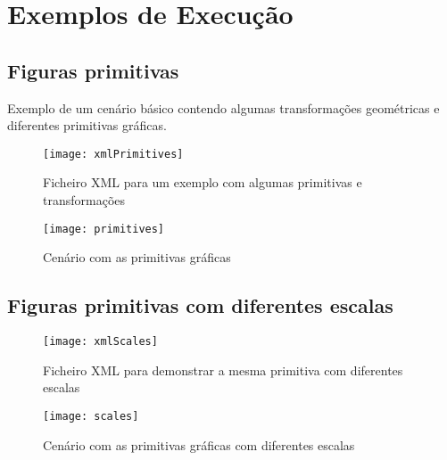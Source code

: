 \documentclass[12pt]{article}
\begin{document}
\section{Exemplos de Execução}
\subsection{Figuras primitivas}
Exemplo de um cenário básico contendo algumas transformações geométricas e diferentes primitivas gráficas.
\begin{figure}[H]
\centering\texttt{[image: xmlPrimitives]} 
\caption{\label{fig:controller}Ficheiro XML para um exemplo com algumas primitivas e transformações}
\end{figure}
\begin{figure}[H]
\centering\texttt{[image: primitives]} 
\caption{\label{fig:controller}Cenário com as primitivas gráficas}
\end{figure}
\subsection{Figuras primitivas com diferentes escalas}
\begin{figure}[H]
\centering\texttt{[image: xmlScales]} 
\caption{\label{fig:controller}Ficheiro XML para demonstrar a mesma primitiva com diferentes escalas}
\end{figure}
\begin{figure}[H]
\centering\texttt{[image: scales]} 
\caption{\label{fig:controller}Cenário com as primitivas gráficas com diferentes escalas}
\end{figure}
\end{document}
